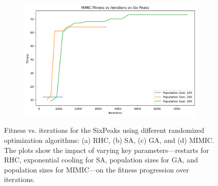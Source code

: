 \begin{figure}[htbp]
\begin{subfigure}[b]{0.49\textwidth}
        \caption{}
        \label{fig:sixpeakga}
    \end{subfigure}
    \hfill
    \begin{subfigure}[b]{0.49\textwidth}
        \centering
        \includegraphics[width=\textwidth]{image/sixpeak/mimic.png}
        \caption{}
        \label{fig:sixpeakmimic}
    \end{subfigure}
    \caption{Fitness vs. iterations for the SixPeaks using different randomized optimization algorithms: (a) RHC, (b) SA, (c) GA, and (d) MIMIC. The plots show the impact of varying key parameters—restarts for RHC, exponential cooling for SA, population sizes for GA, and population sizes for MIMIC—on the fitness progression over iterations.}
    \label{fig:sixpeakgrid}
\end{figure}

